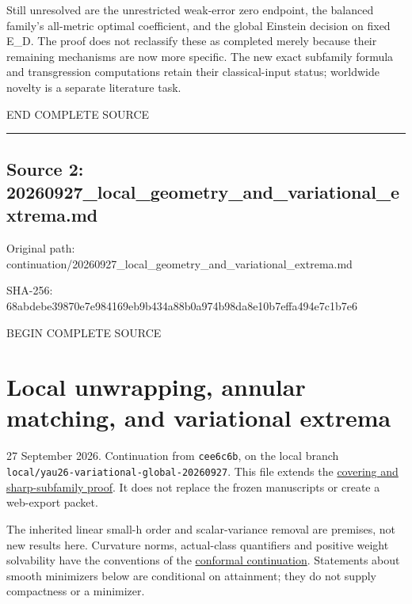 \documentclass[
  10pt,
]{article}
\begin{document}
Still unresolved are the unrestricted weak-error zero endpoint, the
balanced family's all-metric optimal coefficient, and the global
Einstein decision on fixed E\_D. The proof does not reclassify these as
completed merely because their remaining mechanisms are now more
specific. The new exact subfamily formula and transgression computations
retain their classical-input status; worldwide novelty is a separate
literature task.

END COMPLETE SOURCE

\begin{center}\rule{0.5\linewidth}{0.5pt}\end{center}

\hypertarget{source-2-20260927_local_geometry_and_variational_extrema.md}{%
\subsection{Source 2:
20260927\_local\_geometry\_and\_variational\_extrema.md}\label{source-2-20260927_local_geometry_and_variational_extrema.md}}

Original path:
continuation/20260927\_local\_geometry\_and\_variational\_extrema.md

SHA-256:
68abdebe39870e7e984169eb9b434a88b0a974b98da8e10b7effa494e7c1b7e6

BEGIN COMPLETE SOURCE

\hypertarget{local-unwrapping-annular-matching-and-variational-extrema}{%
\section{Local unwrapping, annular matching, and variational
extrema}\label{local-unwrapping-annular-matching-and-variational-extrema}}

27 September 2026. Continuation from \texttt{cee6c6b}, on the local
branch \texttt{local/yau26-variational-global-20260927}. This file
extends the
\href{20260927_covering_geometry_and_sharp_subfamilies.md}{covering and
sharp-subfamily proof}. It does not replace the frozen manuscripts or
create a web-export packet.

The inherited linear small-h order and scalar-variance removal are
premises, not new results here. Curvature norms, actual-class
quantifiers and positive weight solvability have the conventions of the
\href{20260927_conformal_separation_and_zero_end.md}{conformal
continuation}. Statements about smooth minimizers below are conditional
on attainment; they do not supply compactness or a minimizer.
\end{document}
